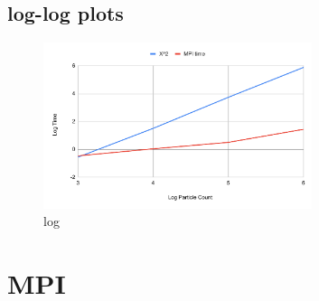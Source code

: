 \documentclass{article}
\begin{document}
\subsection{log-log plots}
\begin{figure}[H] %
\centering %
\includegraphics[width=0.7\textwidth]{loglog.pdf} %
\caption{log} %
\label{log} %
\end{figure}

\section{MPI}
\end{document}
